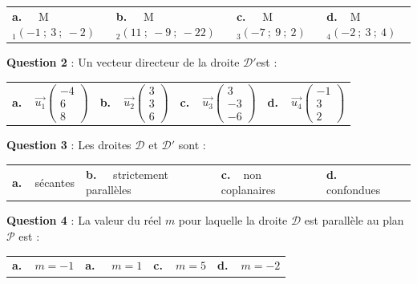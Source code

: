 \documentclass[10pt]{article}
\providecommand{\vect}[1]{\overrightarrow{#1}}
\begin{document}
\begin{center}
\begin{tabularx}{\linewidth}{*{4}{X}}
\textbf{a.~~} M$_1(-1~;~3~;~-2)$&\textbf{b.~~} M$_2(11~;~-9~;~-22)$&\textbf{c.~~} M$_3(-7~;~9~;~ 2)$&\textbf{d.~~}M$_4(-2~;~3~;~4)$
\end{tabularx}
\end{center}
\textbf{Question 2} : Un vecteur directeur de la droite $\mathcal{D}'$est :
\begin{center}
\begin{tabularx}{\linewidth}{*{4}{X}}
\textbf{a.~~}$\vect{u_1}\begin{pmatrix}-4\\6\\8\end{pmatrix}$&\textbf{b.~~}$\vect{u_2}\begin{pmatrix}3\\3\\6\end{pmatrix}$&\textbf{c.~~}$\vect{u_3}\begin{pmatrix}3\\-3\\-6\end{pmatrix}$&\textbf{d.~~}$\vect{u_4}\begin{pmatrix}-1\\3\\2\end{pmatrix}$
\end{tabularx}
\end{center}
\textbf{Question 3} : Les droites $\mathcal{D}$ et $\mathcal{D}'$ sont :
\begin{center}
\begin{tabularx}{\linewidth}{*{4}{X}}
\textbf{a.~~}sécantes &\textbf{b.~~} strictement parallèles&\textbf{c.~~}non coplanaires&\textbf{d.~~}
confondues
\end{tabularx}
\end{center}
\textbf{Question 4} : La valeur du réel $m$ pour laquelle la droite $\mathcal{D}$ est parallèle au plan $\mathcal{P}$ est :
\begin{center}
\begin{tabularx}{\linewidth}{*{4}{X}}
\textbf{a.~~}$m =-1$ &\textbf{a.~~} $m = 1$&\textbf{c.~~}$m = 5$&\textbf{d.~~}$m =-2$
\end{tabularx}
\end{center}

\bigskip
\end{document}
